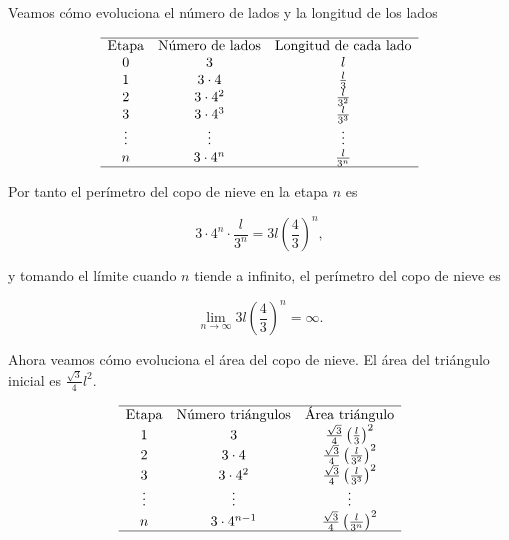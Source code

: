 \documentclass[
  spanish,
  a4paper,
]{scrreport}
\theoremstyle{definition}
\theoremstyle{remark}
\begin{document}
\begin{tcolorbox}[enhanced jigsaw, arc=.35mm, bottomrule=.15mm, bottomtitle=1mm, breakable, colback=white, colbacktitle=quarto-callout-tip-color!10!white, colframe=quarto-callout-tip-color-frame, coltitle=black, left=2mm, leftrule=.75mm, opacityback=0, opacitybacktitle=0.6, rightrule=.15mm, title=\textcolor{quarto-callout-tip-color}{\faLightbulb}\hspace{0.5em}{Solución}, titlerule=0mm, toprule=.15mm, toptitle=1mm]

Veamos cómo evoluciona el número de lados y la longitud de los lados

\[
\begin{array}{ccc}
\hline
\mbox{Etapa} & \mbox{Número de lados} & \mbox{Longitud de cada lado} \\
0 & 3 & l \\
1 & 3\cdot 4 & \frac{l}{3} \\
2 & 3\cdot 4^2 & \frac{l}{3^2} \\
3 & 3\cdot 4^3 & \frac{l}{3^3} \\
\vdots & \vdots & \vdots \\
n & 3 \cdot 4^n & \frac{l}{3^n} \\
\hline
\end{array}
\]

Por tanto el perímetro del copo de nieve en la etapa \(n\) es

\[
3 \cdot 4^n \cdot \frac{l}{3^n}
=3l \left(\frac{4}{3}\right)^n,
\]

y tomando el límite cuando \(n\) tiende a infinito, el perímetro del
copo de nieve es

\[
\lim_{n \to \infty} 3l \left(\frac{4}{3}\right)^n = \infty.
\]

Ahora veamos cómo evoluciona el área del copo de nieve. El área del
triángulo inicial es \(\frac{\sqrt{3}}{4}l^2\).

\[
\begin{array}{ccc}
\hline
\mbox{Etapa} & \mbox{Número triángulos} & \mbox{Área triángulo} \\
1 & 3 & \frac{\sqrt{3}}{4} \left(\frac{l}{3}\right)^2 \\
2 & 3\cdot 4 & \frac{\sqrt{3}}{4} \left(\frac{l}{3^2}\right)^2 \\
3 & 3\cdot 4^2 & \frac{\sqrt{3}}{4} \left(\frac{l}{3^3}\right)^2 \\
\vdots & \vdots & \vdots \\
n & 3 \cdot 4^{n-1} & \frac{\sqrt{3}}{4} \left(\frac{l}{3^n}\right)^2 \\
\hline
\end{array}
\]


\end{tcolorbox}
\end{document}
